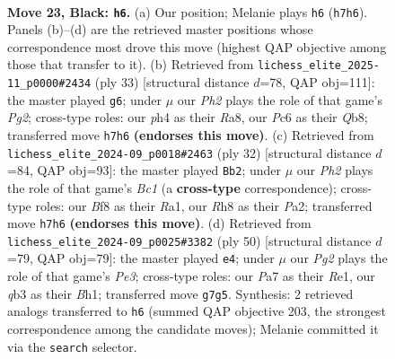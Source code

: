 \documentclass[11pt]{article}
\begin{document}
\clearpage

\begin{figure}[p]\centering
\begin{subfigure}{0.46\textwidth}\centering
\resizebox{\linewidth}{!}{%
\newchessgame
\chessboard[
  setfen={rk3b1r/pp4pp/q1p1b3/3p1p2/P2P3P/1Q2PN2/1PKB1PP1/1R4R1 b - - 4 23},
  showmover=false,
  pgfstyle=straightmove, color=movearrow, markmove={h7-h6}
]}
\caption{}
\end{subfigure}\hfill
\begin{subfigure}{0.46\textwidth}\centering
\resizebox{\linewidth}{!}{%
\newchessgame
\chessboard[
  setfen={rq2kb1r/1p3pp1/p2p4/3P1b1p/1QP2p1P/2N5/PP2BPP1/3RK2R b Kkq - 1 17},
  showmover=false,
  pgfstyle=straightmove, color=movearrow, markmove={g7-g6}
]}
\caption{}
\end{subfigure}
\\[4pt]
\begin{subfigure}{0.46\textwidth}\centering
\resizebox{\linewidth}{!}{%
\newchessgame
\chessboard[
  setfen={r4rk1/pb3ppp/1qpPpn2/1p6/4P3/1Q4P1/P4PBP/R1BR2K1 w - - 1 17},
  showmover=false,
  pgfstyle=straightmove, color=movearrow, markmove={c1-b2}
]}
\caption{}
\end{subfigure}\hfill
\begin{subfigure}{0.46\textwidth}\centering
\resizebox{\linewidth}{!}{%
\newchessgame
\chessboard[
  setfen={4r1k1/pp1q1ppp/2p1bn1r/P7/Q2P4/4P1P1/1P1B1P1P/R3R1KB w - - 7 26},
  showmover=false,
  pgfstyle=straightmove, color=movearrow, markmove={e3-e4}
]}
\caption{}
\end{subfigure}
\caption{\textbf{Move 23, Black: \texttt{h6}.} (a) Our position; Melanie plays \texttt{h6} (\texttt{h7h6}). Panels (b)--(d) are the retrieved master positions whose correspondence most drove this move (highest QAP objective among those that transfer to it). (b) Retrieved from \texttt{lichess\_elite\_2025-11\_p0000\#2434} (ply 33) [structural distance $d$=78, QAP obj=111]: the master played \texttt{g6}; under $\mu$ our \emph{Ph2} plays the role of that game's \emph{Pg2}; cross-type roles: our \emph{p}h4 as their \emph{R}a8, our \emph{P}c6 as their \emph{Q}b8; transferred move \texttt{h7h6} \textbf{(endorses this move)}. (c) Retrieved from \texttt{lichess\_elite\_2024-09\_p0018\#2463} (ply 32) [structural distance $d$=84, QAP obj=93]: the master played \texttt{Bb2}; under $\mu$ our \emph{Ph2} plays the role of that game's \emph{Bc1} (a \textbf{cross-type} correspondence); cross-type roles: our \emph{B}f8 as their \emph{R}a1, our \emph{R}h8 as their \emph{P}a2; transferred move \texttt{h7h6} \textbf{(endorses this move)}. (d) Retrieved from \texttt{lichess\_elite\_2024-09\_p0025\#3382} (ply 50) [structural distance $d$=79, QAP obj=79]: the master played \texttt{e4}; under $\mu$ our \emph{Pg2} plays the role of that game's \emph{Pe3}; cross-type roles: our \emph{P}a7 as their \emph{R}e1, our \emph{q}b3 as their \emph{B}h1; transferred move \texttt{g7g5}. Synthesis: 2 retrieved analogs transferred to \texttt{h6} (summed QAP objective 203, the strongest correspondence among the candidate moves); Melanie committed it via the \texttt{search} selector.}
\label{fig:thought-m45}
\end{figure}
\end{document}
